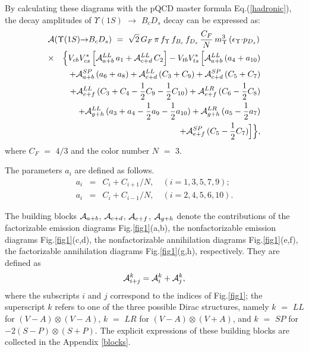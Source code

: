 \documentclass[preprint,superscriptaddress,nofootinbib]{revtex4}
\begin{document}
  By calculating these diagrams with the pQCD master
  formula Eq.(\ref{hadronic}), the decay amplitudes
  of ${\Upsilon}(1S)$ ${\to}$ $B_{c}D_{s}$
  decay can be expressed as:
   \begin{eqnarray}
   \lefteqn{ {\cal A}({\Upsilon}(1S){\to}B_{c}D_{s})\ =\
   \sqrt{2}\,G_{F}\,{\pi}\,f_{\Upsilon}\,f_{B_{c}}\,f_{D_{s}}\,
   \frac{C_{F}}{N}\,m_{{\Upsilon}}^{3}\,({\epsilon}_{\Upsilon}{\cdot}p_{D_{s}}) }
   \nonumber \\ &{\times}&
   \Big\{ V_{cb} V_{cs}^{\ast}\,\Big[ {\cal A}_{a+b}^{LL}\,a_{1}
   +{\cal A}_{c+d}^{LL}\,C_{2} \Big]
   - V_{tb} V_{ts}^{\ast}\,\Big[ {\cal A}_{a+b}^{LL}\,(a_{4}+a_{10})
   \nonumber \\ & &
   + {\cal A}_{a+b}^{SP}\, (a_{6}+a_{8})
   + {\cal A}_{c+d}^{LL}\, (C_{3}+C_{9})
   + {\cal A}_{c+d}^{SP}\, (C_{5}+C_{7})
   \nonumber \\ & &
   + {\cal A}_{e+f}^{LL}\, (C_{3}+C_{4}-\frac{1}{2}C_{9}-\frac{1}{2}C_{10})
   + {\cal A}_{e+f}^{LR}\, (C_{6}-\frac{1}{2}C_{8})
   \nonumber \\ & &
   + {\cal A}_{g+h}^{LL}\, (a_{3}+a_{4}-\frac{1}{2}a_{9}-\frac{1}{2}a_{10})
   + {\cal A}_{g+h}^{LR}\, (a_{5}-\frac{1}{2}a_{7})
   \nonumber \\ & &
   + {\cal A}_{e+f}^{SP}\, (C_{5}-\frac{1}{2}C_{7}) \Big] \Big\}
   \label{amp-all},
   \end{eqnarray}
  where $C_{F}$ $=$ $4/3$ and the color number $N$ $=$ $3$.

  The parameters $a_{i}$ are defined as follows.
  \begin{eqnarray}
  a_{i} &=& C_{i}+C_{i+1}/N, \quad (i=1,3,5,7,9);
  \label{eq:ai1357} \\
  a_{i} &=& C_{i}+C_{i-1}/N, \quad (i=2,4,5,6,10).
  \label{eq:ai2468}
  \end{eqnarray}

  The building blocks ${\cal A}_{a+b}$, ${\cal A}_{c+d}$,
  ${\cal A}_{e+f}$, ${\cal A}_{g+h}$ denote the contributions of
  the factorizable emission diagrams Fig.\ref{fig1}(a,b),
  the nonfactorizable emission diagrams Fig.\ref{fig1}(c,d),
  the nonfactorizable annihilation diagrams Fig.\ref{fig1}(e,f),
  the factorizable annihilation diagrams Fig.\ref{fig1}(g,h),
  respectively. They are defined as
  \begin{equation}
  {\cal A}_{i+j}^{k} = {\cal A}_{i}^{k}+{\cal A}_{j}^{k}
  \label{eq:ampij},
  \end{equation}
  where the subscripts $i$ and $j$ correspond
  to the indices of Fig.\ref{fig1};
  the superscript $k$ refers
  to one of the three possible Dirac structures, namely
  $k$ $=$ $LL$ for $(V-A){\otimes}(V-A)$,
  $k$ $=$ $LR$ for $(V-A){\otimes}(V+A)$, and
  $k$ $=$ $SP$ for $-2(S-P){\otimes}(S+P)$.
  The explicit expressions of these building blocks
  are collected in the Appendix \ref{blocks}.
\end{document}
